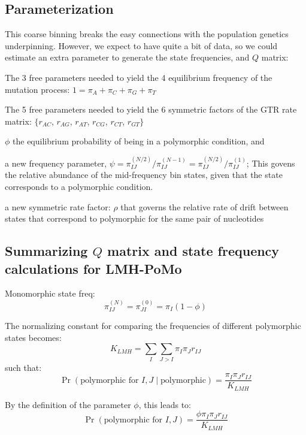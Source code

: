 \documentclass{llncs}
\newcommand{\polyProb}{\ensuremath{\phi}}}
\newcommand{\Klmh}{\ensuremath{K_{LMH}}}}
\begin{document}
\subsection*{Parameterization}

This coarse binning breaks the easy connections with the population genetics underpinning.
However, we expect to have quite a bit of data, so we
could estimate an extra parameter to generate the state frequencies, and $Q$ matrix:
\begin{compactitem}
    \item The 3 free parameters needed to yield the 4 equilibrium frequency of the mutation process: $1 = \pi_A + \pi_C + \pi_G + \pi_T$
    \item The 5 free parameters needed to yield the 6 symmetric factors of the GTR rate matrix:  $\{r_{AC}$, $r_{AG}$, $r_{AT}$, $r_{CG}$, $r_{CT}$, $r_{GT}\}$
    \item $\phi$ the equilibrium probability of being in a polymorphic condition, and
    \item a new frequency parameter, $\psi = \pi_{IJ}^{(N/2)}/\pi_{IJ}^{(N-1)} = \pi_{IJ}^{(N/2)}/\pi_{IJ}^{(1)}$; This govens the relative abundance of the mid-frequency bin states, given that 
    the state corresponds to a polymorphic condition.
    \item a new symmetric rate factor: $\rho$ that governs the relative rate of drift between states that correspond to polymorphic for the same pair of nucleotides
\end{compactitem}

\subsection*{Summarizing $Q$ matrix and state frequency calculations for LMH-PoMo}

Monomorphic state freq: 
\begin{equation}
    \pi_{IJ}^{(N)} = \pi_{JI}^{(0)} = \pi_I(1-\polyProb)
\end{equation}

The normalizing constant for comparing the frequencies of different polymorphic states becomes:
\begin{equation}
    \Klmh = \sum_I\sum_{J > I}\pi_I\pi_J r_{IJ}
\end{equation}
such that:
    $$\Pr(\mbox{polymorphic for }I, J \mid \mbox{polymorphic}) = \frac{\pi_I\pi_J r_{IJ}}{\Klmh}$$

By the definition of the parameter $\phi$, this leads to:
    $$\Pr(\mbox{polymorphic for }I, J) = \frac{\phi\pi_I\pi_J r_{IJ}}{\Klmh}$$
\end{document}
